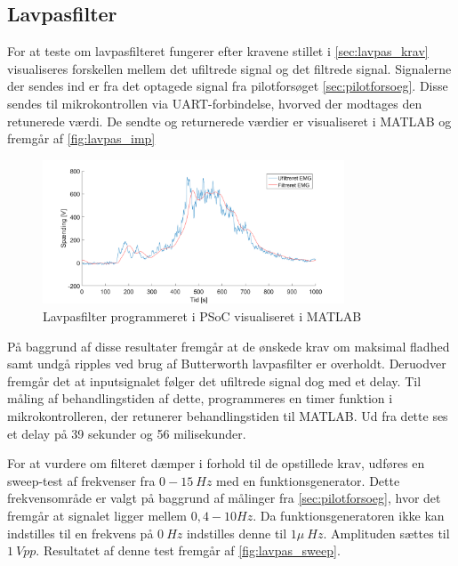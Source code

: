 \subsection{Lavpasfilter}
For at teste om lavpasfilteret fungerer efter kravene stillet i \autoref{sec:lavpas_krav} visualiseres forskellen mellem det ufiltrede signal og det filtrede signal. Signalerne der sendes ind er fra det optagede signal fra pilotforsøget \autoref{sec:pilotforsoeg}. Disse sendes til mikrokontrollen via UART-forbindelse, hvorved der modtages den retunerede værdi. De sendte og returnerede værdier er visualiseret i MATLAB og fremgår af \autoref{fig:lavpas_imp}

\begin{figure}[H]
\centering
\includegraphics[width=0.8\textwidth]{figures/EMG_test}
\caption{Lavpasfilter programmeret i PSoC visualiseret i MATLAB}
\label{fig:lavpas_imp}
\end{figure}

På baggrund af disse resultater fremgår at de ønskede krav om maksimal fladhed samt undgå ripples ved brug af Butterworth lavpasfilter er overholdt. 
Deruodver fremgår det at inputsignalet følger det ufiltrede signal dog med et delay. Til måling af behandlingstiden af dette, programmeres en timer funktion i mikrokontrolleren, der retunerer behandlingstiden til MATLAB. Ud fra dette ses et delay på 39 sekunder og 56 milisekunder.


For at vurdere om filteret dæmper i forhold til de opstillede krav, udføres en sweep-test af frekvenser fra $0-15~Hz$ med en funktionsgenerator. Dette frekvensområde er valgt på baggrund af målinger fra \autoref{sec:pilotforsoeg}, hvor det fremgår at signalet ligger mellem $0,4-10Hz$.  Da funktionsgeneratoren ikke kan indstilles til en frekvens på $0~Hz$ indstilles denne til $1 \mu~Hz$. Amplituden sættes til $1~Vpp$. Resultatet af denne test fremgår af \autoref{fig:lavpas_sweep}. 


